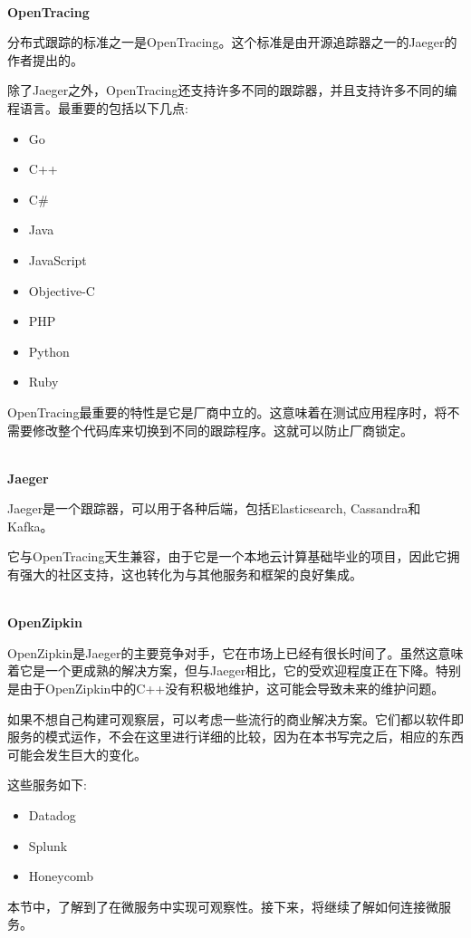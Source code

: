 \hspace*{\fill} \\ %
\noindent
\textbf{OpenTracing}

分布式跟踪的标准之一是OpenTracing。这个标准是由开源追踪器之一的Jaeger的作者提出的。

除了Jaeger之外，OpenTracing还支持许多不同的跟踪器，并且支持许多不同的编程语言。最重要的包括以下几点:

\begin{itemize}
\item 
Go

\item 
C++

\item 
C\#

\item 
Java

\item 
JavaScript

\item 
Objective-C

\item 
PHP

\item 
Python

\item 
Ruby
\end{itemize}

OpenTracing最重要的特性是它是厂商中立的。这意味着在测试应用程序时，将不需要修改整个代码库来切换到不同的跟踪程序。这就可以防止厂商锁定。

\hspace*{\fill} \\ %
\noindent
\textbf{Jaeger}

Jaeger是一个跟踪器，可以用于各种后端，包括Elasticsearch, Cassandra和Kafka。

它与OpenTracing天生兼容，由于它是一个本地云计算基础毕业的项目，因此它拥有强大的社区支持，这也转化为与其他服务和框架的良好集成。

\hspace*{\fill} \\ %
\noindent
\textbf{OpenZipkin}

OpenZipkin是Jaeger的主要竞争对手，它在市场上已经有很长时间了。虽然这意味着它是一个更成熟的解决方案，但与Jaeger相比，它的受欢迎程度正在下降。特别是由于OpenZipkin中的C++没有积极地维护，这可能会导致未来的维护问题。


如果不想自己构建可观察层，可以考虑一些流行的商业解决方案。它们都以软件即服务的模式运作，不会在这里进行详细的比较，因为在本书写完之后，相应的东西可能会发生巨大的变化。

这些服务如下:

\begin{itemize}
\item 
Datadog

\item 
Splunk

\item 
Honeycomb
\end{itemize}

本节中，了解到了在微服务中实现可观察性。接下来，将继续了解如何连接微服务。













